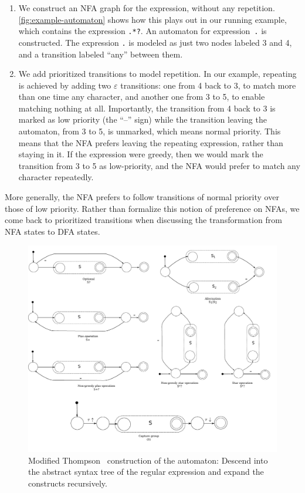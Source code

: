 \documentclass[11pt,a4paper,twoside,openright]{Thesis}
\theoremstyle{definition}
\begin{document}
\begin{enumerate}
\item We construct an NFA graph for the expression, without any
repetition.  \autoref{fig:example-automaton} shows how this plays
out in our running example, which contains the expression \texttt{.*?}.
An automaton for expression~\texttt{.} is constructed. The expression
\texttt{.} is modeled as just two nodes labeled 3 and 4, and a
transition labeled ``any'' between them.

\item We add prioritized transitions to model repetition. In our
example, repeating is achieved by adding two $\varepsilon$ transitions:
one from 4 back to 3, to match more than one time any character,
and another one from 3 to 5, to enable matching nothing at all.
Importantly, the transition from 4 back to 3 is marked as low
priority (the ``--'' sign) while the transition leaving the automaton,
from 3 to 5, is unmarked, which means normal priority.  This means
that the NFA prefers leaving the repeating expression, rather
than staying in it.  If the expression were greedy, then we would
mark the transition from 3 to 5 as low-priority, and the NFA would
prefer to match any character repeatedly.

\end{enumerate}

More generally, the NFA prefers to follow transitions of normal
priority over those of low priority. Rather than formalize this
notion of preference on NFAs, we come back to prioritized transitions when
discussing the transformation from NFA states to DFA states.

\begin{figure}[tb] \includegraphics[width=\linewidth]{graphs/thompson}
  \caption[Modified Thompson construction]{Modified Thompson~\cite{Thom68a} construction of the
automaton: Descend into the abstract syntax tree of the regular
expression and expand the constructs recursively.}
\label{fig:thompson-construction}
\end{figure}
\end{document}
